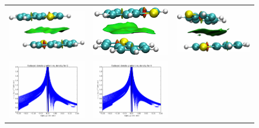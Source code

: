 \begin{figure}[H]
\begin{center}
\begin{tabular}{c c c}
					\includegraphics{image/image/P1-F841} & \includegraphics{image/image/P1-F842} & \includegraphics{image/image/P1-F843}\\
					\includegraphics{image/image/P1-F851} & \includegraphics{image/image/P1-F852} & \\

\end{tabular}
\end{center}
\end{figure}
